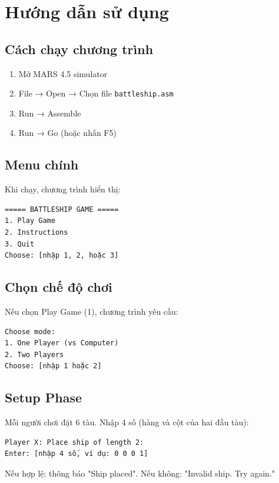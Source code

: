 
\section{Hướng dẫn sử dụng}

\subsection{Cách chạy chương trình}

\begin{enumerate}
    \item Mở MARS 4.5 simulator
    \item File → Open → Chọn file \texttt{battleship.asm}
    \item Run → Assemble
    \item Run → Go (hoặc nhấn F5)
\end{enumerate}

\subsection{Menu chính}

Khi chạy, chương trình hiển thị:

\begin{verbatim}
===== BATTLESHIP GAME =====
1. Play Game
2. Instructions
3. Quit
Choose: [nhập 1, 2, hoặc 3]
\end{verbatim}

\subsection{Chọn chế độ chơi}

Nếu chọn Play Game (1), chương trình yêu cầu:

\begin{verbatim}
Choose mode:
1. One Player (vs Computer)
2. Two Players
Choose: [nhập 1 hoặc 2]
\end{verbatim}

\subsection{Setup Phase}

Mỗi người chơi đặt 6 tàu. Nhập 4 số (hàng và cột của hai đầu tàu):

\begin{verbatim}
Player X: Place ship of length 2:
Enter: [nhập 4 số, ví dụ: 0 0 0 1]
\end{verbatim}

Nếu hợp lệ: thông báo "Ship placed". Nếu không: "Invalid ship. Try again."

